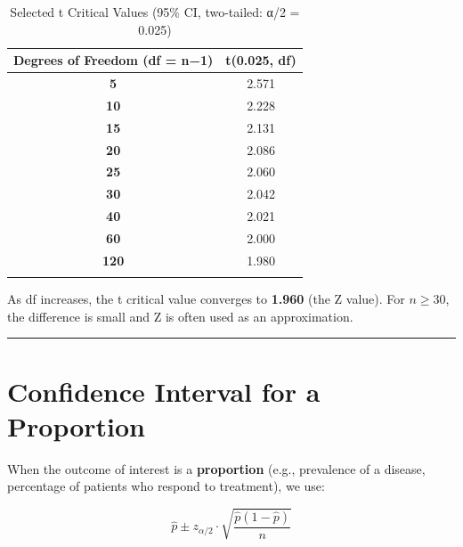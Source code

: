 \documentclass[
  12pt,
  letterpaper,
]{book}
\begin{document}
\begin{longtable}[t]{>{}cc}

\caption{\label{tbl-t-critical}Selected t Critical Values (95\% CI,
two-tailed: α/2 = 0.025)}

\tabularnewline

\toprule
Degrees of Freedom (df = n−1) & t(0.025, df)\\
\midrule
\textcolor[HTML]{2c7bb6}{\textbf{5}} & 2.571\\
\textcolor[HTML]{2c7bb6}{\textbf{10}} & 2.228\\
\textcolor[HTML]{2c7bb6}{\textbf{15}} & 2.131\\
\textcolor[HTML]{2c7bb6}{\textbf{20}} & 2.086\\
\textcolor[HTML]{2c7bb6}{\textbf{25}} & 2.060\\
\addlinespace
\textcolor[HTML]{2c7bb6}{\textbf{30}} & 2.042\\
\textcolor[HTML]{2c7bb6}{\textbf{40}} & 2.021\\
\textcolor[HTML]{2c7bb6}{\textbf{60}} & 2.000\\
\textcolor[HTML]{2c7bb6}{\textbf{120}} & 1.980\\
\cellcolor[HTML]{eaf4fb}{\textbf{\textcolor[HTML]{2c7bb6}{\textbf{∞ (Z)}}}} & \cellcolor[HTML]{eaf4fb}{\textbf{1.960}}\\
\bottomrule

\end{longtable}

\endgroup{}

As df increases, the t critical value converges to \textbf{1.960} (the Z
value). For \(n \geq 30\), the difference is small and Z is often used
as an approximation.

\begin{center}\rule{0.5\linewidth}{0.5pt}\end{center}


\chapter{Confidence Interval for a
Proportion}\label{confidence-interval-for-a-proportion}

When the outcome of interest is a \textbf{proportion} (e.g., prevalence
of a disease, percentage of patients who respond to treatment), we use:

\[\hat{p} \pm z_{\alpha/2} \cdot \sqrt{\frac{\hat{p}(1-\hat{p})}{n}}\]
\end{document}

